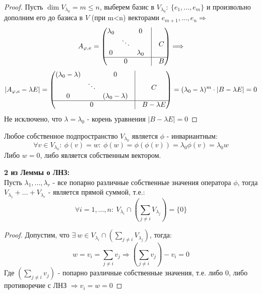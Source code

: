     \begin{proof}
        Пусть $\dim V_{\lambda_0} = m \leq n$, выберем базис в $V_{\lambda_0}: \ \{e_1,...,e_m\}$ и произвольно дополним его до базиса в $V$ (при m<n) векторами $e_{m+1},...,e_n \Longrightarrow$
        $$A_{\phi,e} = \begin{pmatrix}
            \lambda_0 & \null & 0 & \vline & \null \\
            \null & \ddots & \null & \vline & C \\
            0 & \null & \lambda_0 & \vline & \null \\
            \hline
            \null & 0 & \null & \vline & B
        \end{pmatrix} \Longrightarrow $$
        $$|A_{\phi,e} - \lambda E| = \begin{pmatrix}
            (\lambda_0 - \lambda) & \null & 0 & \vline & \null \\
            \null & \ddots & \null & \vline & C \\
            0 & \null & (\lambda_0 - \lambda) & \vline & \null \\
            \hline
            \null & 0 & \null & \vline & B - \lambda E
        \end{pmatrix} = (\lambda_0-\lambda)^m\cdot |B-\lambda E|=0$$
        Не исключено, что $\lambda = \lambda_0$ - корень уравнения $|B-\lambda E| =0 $       
    \end{proof} 
    \begin{remark}
        Любое собственное подпространство $V_{\lambda_0}$ является $\phi$ - инвариантным:
        $$\forall v \in V_{\lambda_0}: \ \phi(v) = w: \ \phi(w) = \phi(\phi(v)) = \lambda_0 \phi(v) = \lambda_0 w$$
        Либо $w=0$, либо является собственным вектором.   
    \end{remark}
    \begin{consequense} \textbf{2 из Леммы о ЛНЗ:} \\
        Пусть $\lambda_1,...,\lambda_r$ - все попарно различные собственные значения оператора $\phi$, тогда $V_{\lambda_1} + ... + V_{\lambda_r}$ - является прямой суммой, т.е.:
        $$\forall i = 1,...,n: \  V_{\lambda_i} \cap (\sum \limits_{j\neq i}V_{\lambda_j}) = \{0\}$$   
    \end{consequense}
    \begin{proof}
        Допустим, что $\exists \ w \in V_{\lambda_i} \cap (\sum \limits_{j\neq i}V_{\lambda_j})$, тогда: 
        $$w = v_i = \sum \limits_{j\neq i}v_j \Longrightarrow (\sum \limits_{j\neq i}v_j) - v_i = 0$$
        Где $(\sum \limits_{j\neq i}v_j)$ - попарно различные собственные значения, т.е. либо $0$, либо противоречие с ЛНЗ $\Longrightarrow v_i = w = 0$    
    \end{proof}
